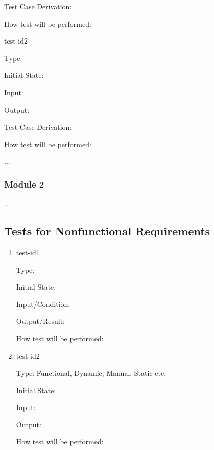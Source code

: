 \documentclass[12pt, titlepage]{article}
\begin{document}
Test Case Derivation: 

How test will be performed: 
					
\item{test-id2\\}

Type: 
					
Initial State: 
					
Input: 
					
Output: 

Test Case Derivation: 

How test will be performed: 

\item{...\\}
    
\subsubsection{Module 2}

...

\subsection{Tests for Nonfunctional Requirements}
		
\begin{enumerate}

\item{test-id1\\}

Type: 
					
Initial State: 
					
Input/Condition: 
					
Output/Result: 
					
How test will be performed: 
					
\item{test-id2\\}

Type: Functional, Dynamic, Manual, Static etc.
					
Initial State: 
					
Input: 
					
Output: 
					
How test will be performed: 

\end{enumerate}
\end{document}
